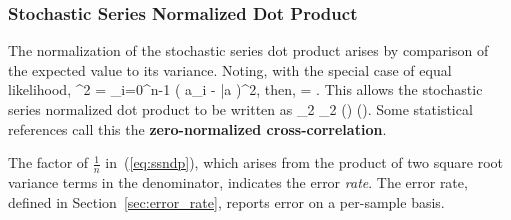 \subsubsection{Stochastic Series Normalized Dot Product}
The normalization of the stochastic 
series dot product arises by comparison of the 
expected value to its variance.  
Noting, with the special case of equal
likelihood,
\be 
 \sigma^2 =  \sum_{i=0}^{n-1}
 \left( a_i - \bar{a} \right)^2,
\ee
then, 
\be 
 \sigma = 
 .
\ee
This allows the stochastic series normalized dot product to be 
written as 
\be
\frac{\va}{\parallel \va \parallel}_2
\cdot
\frac{\vb}{\parallel \vb \parallel}_2
{}
{ 
\left(\right) \; 
\left(\right)}.
\label{eq:ssndp}
\ee
Some statistical references call this the 
{\bf zero-normalized cross-correlation}.

\begin{Hremark}
The factor of $\frac{1}{n}$ 
in~(\ref{eq:ssndp}), which arises from the 
product of two square root 
variance terms in the denominator,  
indicates the error {\em rate}.  
The error rate, defined 
in Section~\ref{sec:error_rate}, reports
error on a per-sample basis.
\end{Hremark}

